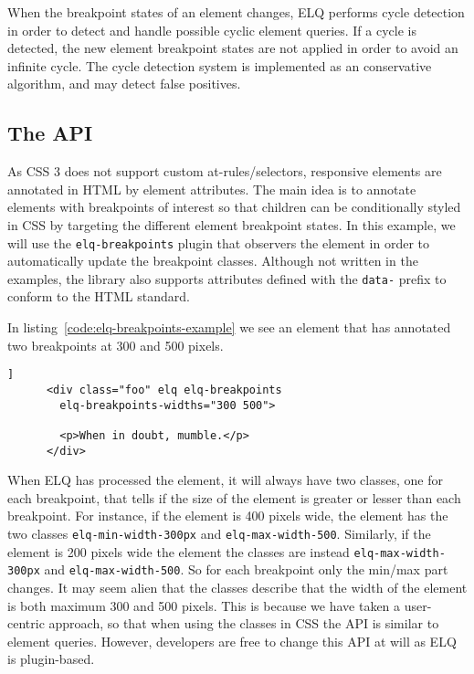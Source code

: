 \documentclass{acm_proc_article-sp}
\newcommand{\code}[1]{\texttt{#1}}
\newcommand{\elq}{ELQ}
\begin{document}
  When the breakpoint states of an element changes, \elq{} performs cycle detection in order to detect and handle possible cyclic element queries.
  If a cycle is detected, the new element breakpoint states are not applied in order to avoid an infinite cycle.
  The cycle detection system is implemented as an conservative algorithm, and may detect false positives.

  \subsection{The API}
    As CSS 3 does not support custom at-rules/selectors, responsive elements are annotated in HTML by element attributes.
    The main idea is to annotate elements with breakpoints of interest so that children can be conditionally styled in CSS by targeting the different element breakpoint states.
    In this example, we will use the \code{elq-breakpoints} plugin that observers the element in order to automatically update the breakpoint classes.
    Although not written in the examples, the library also supports attributes defined with the \code{data-} prefix to conform to the HTML standard.

    In listing~\ref{code:elq-breakpoints-example} we see an element that has annotated two breakpoints at 300 and 500 pixels.

    \begin{lstlisting}[gobble=6,caption={},captionpos=b,label={code:elq-breakpoints-example}]]
      <div class="foo" elq elq-breakpoints
        elq-breakpoints-widths="300 500">
        
        <p>When in doubt, mumble.</p>
      </div>
    \end{lstlisting}

    When \elq{} has processed the element, it will always have two classes, one for each breakpoint, that tells if the size of the element is greater or lesser than each breakpoint.
    For instance, if the element is 400 pixels wide, the element has the two classes \code{elq-min-width-300px} and \code{elq-max-width-500}.
    Similarly, if the element is 200 pixels wide the element the classes are instead \code{elq-max-width-300px} and \code{elq-max-width-500}.
    So for each breakpoint only the min/max part changes.
    It may seem alien that the classes describe that the width of the element is both maximum 300 and 500 pixels.
    This is because we have taken a user-centric approach, so that when using the classes in CSS the API is similar to element queries.
    However, developers are free to change this API at will as \elq{} is plugin-based.
\end{document}
